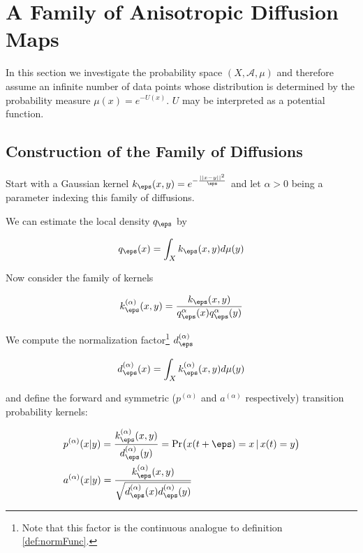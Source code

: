 \section{A Family of Anisotropic Diffusion Maps}

In this section we investigate the probability space $(X, \mathcal{A}, \mu)$ and therefore assume an infinite number of data points whose distribution is determined by the probability measure $\mu(x)=e^{-U(x)}$. $U$ may be interpreted as a potential function.

\subsection{Construction of the Family of Diffusions}
Start with a Gaussian kernel $k_\eps(x,y)=e^{-\frac{||x-y||^2}{\eps}}$ and let $\alpha > 0$ being a parameter indexing this family of diffusions.

We can estimate the local density $q_\eps$ by 

\begin{definition}
$$q_\eps(x)=\int_X k_\eps(x,y)d\mu(y)$$
\end{definition}

Now consider the family of kernels

\begin{definition}
$$k_\eps^{(\alpha)}(x,y)=\frac{k_\eps(x,y)}{q_\eps^\alpha(x)q_\eps^\alpha(y)} $$
\end{definition}

We compute the normalization factor\footnote{Note that this factor is the continuous analogue to definition \ref{def:normFunc}.} $d_\eps^{(\alpha)}$

$$d_\eps^{(\alpha)}(x) = \int_X k_\eps^{(\alpha)}(x,y)d\mu(y)$$

and define the forward and symmetric ($p^{(\alpha)}$ and $a^{(\alpha)}$ respectively) transition probability kernels:

\begin{definition}\begin{equation*}\begin{aligned}
&p^{(\alpha)}(x|y) = \frac{k_\eps^{(\alpha)}(x,y)}{d_\eps^{(\alpha)}(y)} = \text{Pr}\big(x(t+\eps)=x \, |\, x(t)=y\big)\\
&a^{(\alpha)}(x|y) = \frac{k_\eps^{(\alpha)}(x,y)}{\sqrt{d_\eps^{(\alpha)}(x)d_\eps^{(\alpha)}(y)}}
\end{aligned}\end{equation*}\end{definition}

